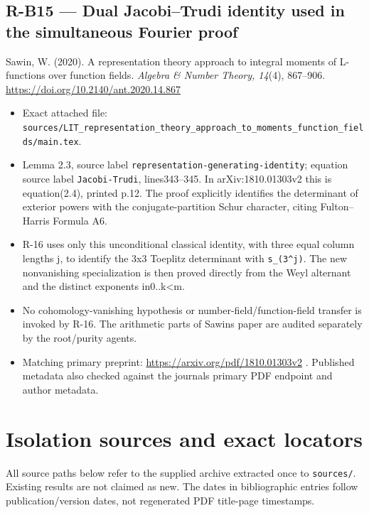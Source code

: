 \documentclass[11pt,a4paper]{article}
\providecommand{\tightlist}{\setlength{\itemsep}{0pt}\setlength{\parskip}{0pt}}
\theoremstyle{definition}\newtheorem{definition}{Definition}
\begin{document}
\subsection{R-B15 --- Dual Jacobi--Trudi identity used in the
simultaneous Fourier
proof}\label{r-b15--dual-jacobitrudi-identity-used-in-the-simultaneous-fourier-proof}

Sawin, W. (2020). A representation theory approach to integral moments
of L-functions over function fields. \emph{Algebra \& Number Theory,
14}(4), 867--906. \url{https://doi.org/10.2140/ant.2020.14.867}

\begin{itemize}
\tightlist
\item
  Exact attached file:
  \nolinkurl{sources/LIT_representation_theory_approach_to_moments_function_fields/main.tex}.
\item
  Lemma 2.3, source label \nolinkurl{representation-generating-identity};
  equation source label \nolinkurl{Jacobi-Trudi}, lines343--345. In
  arXiv:1810.01303v2 this is equation(2.4), printed p.12. The proof
  explicitly identifies the determinant of exterior powers with the
  conjugate-partition Schur character, citing Fulton--Harris Formula A6.
\item
  R-16 uses only this unconditional classical identity, with three equal
  column lengths j, to identify the 3x3 Toeplitz determinant with
  \texttt{s\_(3\^{}j)}. The new nonvanishing specialization is then
  proved directly from the Weyl alternant and the distinct exponents
  in0..k\textless m.
\item
  No cohomology-vanishing hypothesis or number-field/function-field
  transfer is invoked by R-16. The arithmetic parts of
  Sawin\textquotesingle s paper are audited separately by the
  root/purity agents.
\item
  Matching primary preprint: \url{https://arxiv.org/pdf/1810.01303v2} .
  Published metadata also checked against the journal\textquotesingle s
  primary PDF endpoint and author metadata.
\end{itemize}
\section{Isolation sources and exact
locators}\label{isolation-sources-and-exact-locators}

All source paths below refer to the supplied archive extracted once to
\nolinkurl{sources/}. Existing results are not claimed as new. The dates in
bibliographic entries follow publication/version dates, not regenerated
PDF title-page timestamps.
\end{document}
